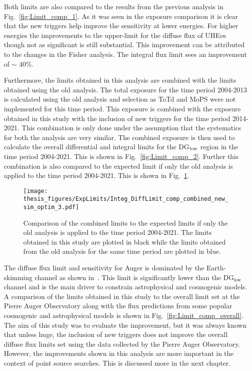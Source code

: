 Both limits are also compared to the results from the previous analysis in Fig.~\ref{fig:Limit_comp_1}. As it was seen in the exposure comparison it is clear that the new triggers help improve the sensitivity at lower energies. For higher energies the improvements to the upper-limit for the diffuse flux of UHE${\nu}$s though not as significant is still substantial. This improvement can be attributed to the changes in the Fisher analysis. The integral flux limit sees an improvement of $\sim$ 40\%. 

Furthermore, the limits obtained in this analysis are combined with the limits obtained using the old analysis. The total exposure for the time period 2004-2013 is calculated using the old analysis and selection as ToTd and MoPS were not implemented for this time period. This exposure is combined with the exposure obtained in this study with the inclusion of new triggers for the time period 2014-2021. This combination is only done under the assumption that the systematics for both the analysis are very similar. The combined exposure is then used to calculate the overall differential and integral limits for the DG$_{\text{\text{low}}}$ region in the time period 2004-2021. This is shown in Fig.~\ref{fig:Limit_comp_2}. Further this combination is also compared to the expected limit if only the old analysis is applied to the time period 2004-2021. This is shown in Fig.~\ref{fig:Limit_comp_3}.



\begin{figure}[h!]
  \centering
  \texttt{[image: thesis\_figures/ExpLimits/Integ\_DiffLimit\_comp\_combined\_new\_sim\_optim\_3.pdf]}
  \caption{Comparison of the combined limits to the expected limits if only the old analysis is applied to the time period 2004-2021. The limits obtained in this study are plotted in black while the limits obtained from the old analysis for the same time period are plotted in blue.}
  \label{fig:Limit_comp_3}
\end{figure}

The diffuse flux limit and sensitivity for Auger is dominated by the Earth-skimming channel as shown in~\cite{Aab_2019_diffuse}. This limit is significantly lower than the DG$\mathrm{_{\text{low}}}$ channel and is the main driver to constrain astrophysical and cosmogenic models. A comparison of the limits obtained in this study to the overall limit set at the Pierre Auger Observatory along with the flux predictions from some popular cosmogenic and astrophysical models is shown in Fig.~\ref{fig:Limit_comp_overall}. The aim of this study was to evaluate the improvement, but it was always known that unless huge, the inclusion of new triggers does not improve the overall diffuse flux limits set using the data collected by the Pierre Auger Observatory. However, the improvements shown in this analysis are more important in the context of point source searches. This is discussed more in the next chapter. 

